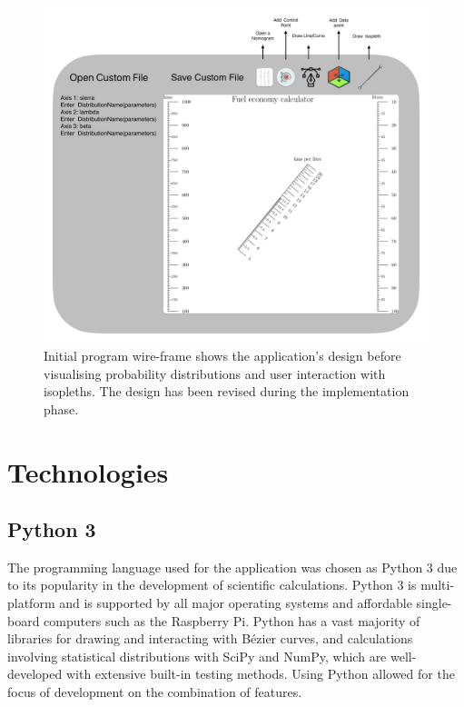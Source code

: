 \documentclass{l4proj}
\begin{document}
\begin{figure}[H]
    \centering
    \includegraphics[width=1.3\linewidth]{dissertation/images/myFigures/design/wireframe.pdf}
    \caption{Initial program wire-frame shows the application's design before visualising probability distributions and user interaction with isopleths. The design has been revised during the implementation phase. }
    \label{fig:design-wireframe}
\end{figure}


\section{Technologies}

\subsection{Python 3}
The programming language used for the application was chosen as Python 3 due to its popularity in the development of scientific calculations. Python 3 is multi-platform and is supported by all major operating systems and affordable single-board computers such as the Raspberry Pi. Python has a vast majority of libraries for drawing and interacting with Bézier curves, and calculations involving statistical distributions with SciPy and NumPy, which are well-developed with extensive built-in testing methods. Using Python allowed for the focus of development on the combination of features.
\end{document}
